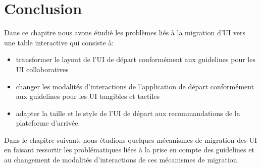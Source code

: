 \section{Conclusion}
\label{sec:chap2:6}
Dans ce chapitre nous avons étudié les problèmes liés à la migration d'UI vers une table interactive qui consiste à:
\begin{itemize}
\item transformer le layout de l'UI de départ conformément aux guidelines pour les UI collaboratives
\item changer les modalités d'interactions de l'application de départ conformément aux guidelines pour les UI tangibles et tactiles
\item adapter la taille et le style de l'UI de départ aux recommandations de la plateforme d'arrivée.
\end{itemize}

Dans le chapitre suivant, nous étudions quelques mécanismes de migration des UI en faisant ressortir les problématiques liées à la prise en compte des guidelines et au changement de modalités d'interactions de ces mécanismes de migration.